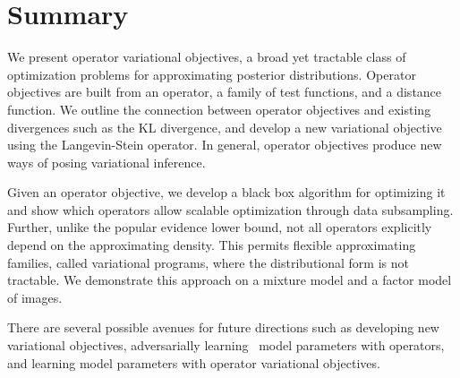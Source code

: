
\section{Summary}
\label{sec:discussion}

We present operator variational objectives, a broad yet tractable
class of optimization problems for approximating posterior
distributions.  Operator objectives are built from an operator, a
family of test functions, and a distance function.  We outline the
connection between operator objectives and existing divergences such
as the KL divergence, and develop a new variational objective using
the Langevin-Stein operator.  In general, operator objectives produce
new ways of posing variational inference.

Given an operator objective, we develop a black box algorithm for
optimizing it and show which operators allow scalable optimization
through data subsampling.  Further, unlike the popular evidence lower
bound, not all operators explicitly depend on the approximating
density. This permits flexible approximating families, called
variational programs, where the distributional form is not
tractable. We demonstrate this approach on a mixture model and a
factor model of images.

There are several possible avenues for future directions such as
developing new variational objectives, adversarially learning~\citep{goodfellow2014generative} model parameters with operators, and
learning model parameters with operator variational objectives.
